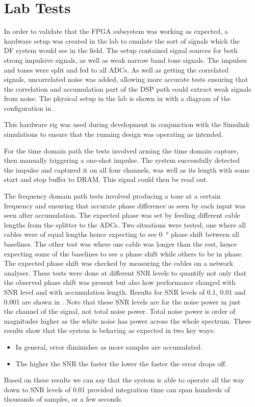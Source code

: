 \section{Lab Tests}
In order to validate that the FPGA subsystem was working as expected, a hardware setup was created in the lab to emulate the sort of signals which the DF system would see in the field. The setup contained signal sources for both strong impulsive signals, as well as weak narrow band tone signals. The impulses and tones were split and fed to all ADCs. As well as getting the correlated signals, uncorrelated noise was added, allowing more accurate tests ensuring that the correlation and accumulation part of the DSP path could extract weak signals from noise. The physical setup in the lab is shown in  with a diagram of the configuration in . 

This hardware rig was used during development in conjunction with the Simulink simulations to ensure that the running design was operating as intended. 

For the time domain path the tests involved arming the time domain capture, then manually triggering a one-shot impulse. The system successfully detected the impulse and captured it on all four channels, was well as its length with some start and stop buffer to DRAM. This signal could then be read out.

The frequency domain path tests involved producing a tone at a certain frequency and ensuring that accurate phase difference as seen by each input was seen after accumulation. The expected phase was set by feeding different cable lengths from the splitter to the ADCs. Two situations were tested, one where all cables were of equal lengths hence expecting to see \SI{0}{\degree} phase shift between all baselines. The other test was where one cable was longer than the rest, hence expecting some of the baselines to see a phase shift while others to be in phase. The expected phase shift was checked by measuring the cables on a network analyser. These tests were done at different SNR levels to quantify not only that the observed phase shift was present but also how performance changed with SNR level and with accumulation length. Results for SNR levels of 0.1, 0.01 and 0.001 are shown in . Note that these SNR levels are for the noise power in just the channel of the signal, not total noise power. Total noise power is order of magnitudes higher as the white noise has power across the whole spectrum. These results show that the system is behaving as expected in two key ways:
\begin{itemize}
  \item In general, error diminishes as more samples are accumulated.
  \item The higher the SNR the faster the lower the faster the error drops off.
\end{itemize}
Based on these results we can say that the system is able to operate all the way down to SNR levels of 0.01 provided integration time can span hundreds of thousands of samples, or a few seconds.

